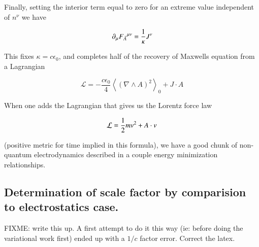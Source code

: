 \documentclass{article}
\newcommand{\LL}[0]{\mathcal{L}}
\newcommand{\gpgrade}[2] {{\left\langle{{#1}}\right\rangle}_{#2}}
\newcommand{\gpgradezero}[1] {\gpgrade{#1}{0}}
\newcommand{\grad}[0]{\nabla}
\newcommand{\barA}[0]{\bar{A}}
\begin{document}
Finally, setting the interior term equal to zero for an extreme value independent of $n^{\nu}$ we have

\begin{equation*}
\partial_{\mu} {F_{\barA}}^{\mu\nu} = \inv{\kappa} J^{\nu}
\end{equation*}

This fixes $\kappa = c \epsilon_0$, and completes half of the recovery of Maxwells equation from a Lagrangian

\begin{equation}
\LL = -\frac{c \epsilon_0}{4} \gpgradezero{(\grad \wedge A)^2} + J \cdot A
\end{equation}

When one adds the Lagrangian that gives us the Lorentz force law

\begin{equation*}
\LL = \inv{2}m v^2 + A \cdot v
\end{equation*}

(positive metric for time implied in this formula), we have a good chunk of non-quantum electrodynamics described in a couple energy minimization relationships.

\subsection{ Determination of scale factor by comparision to electrostatics case. }

FIXME: write this up.  A first attempt to do it this way (ie: before doing the variational work first) ended up with a $1/c$ factor error.   Correct the latex.
\end{document}

